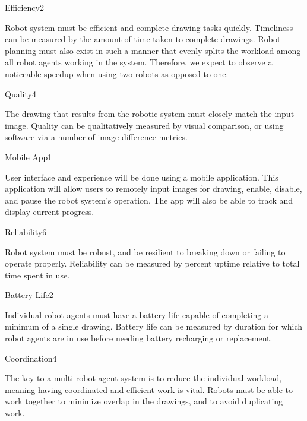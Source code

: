 \begin{nonfunctional_requirement}{Efficiency}{2}
\item Robot system must be efficient and complete drawing tasks quickly. Timeliness can be measured by the amount of time taken to complete drawings. Robot planning must also exist in such a manner that evenly splits the workload among all robot agents working in the system. Therefore, we expect to observe a noticeable speedup when using two robots as opposed to one. 
\end{nonfunctional_requirement}

\begin{nonfunctional_requirement}{Quality}{4}
\item The drawing that results from the robotic system must closely match the input image. Quality can be qualitatively measured by visual comparison, or using software via a number of image difference metrics.
\end{nonfunctional_requirement}

\begin{nonfunctional_requirement}{Mobile App}{1}
\item User interface and experience will be done using a mobile application. This application will allow users to remotely input images for drawing, enable, disable, and pause the robot system's operation. The app will also be able to track and display current progress.
\end{nonfunctional_requirement}

\begin{nonfunctional_requirement}{Reliability}{6}
\item Robot system must be robust, and be resilient to breaking down or failing to operate properly. Reliability can be measured by percent uptime relative to total time spent in use.
\end{nonfunctional_requirement}

\begin{nonfunctional_requirement}{Battery Life}{2}
\item Individual robot agents must have a battery life capable of completing a minimum of a single drawing. Battery life can be measured by duration for which robot agents are in use before needing battery recharging or replacement.
\end{nonfunctional_requirement}

\begin{nonfunctional_requirement}{Coordination}{4}
\item The key to a multi-robot agent system is to reduce the individual workload, meaning having coordinated and efficient work is vital. Robots must be able to work together to minimize overlap in the drawings, and to avoid duplicating work.
\end{nonfunctional_requirement}

